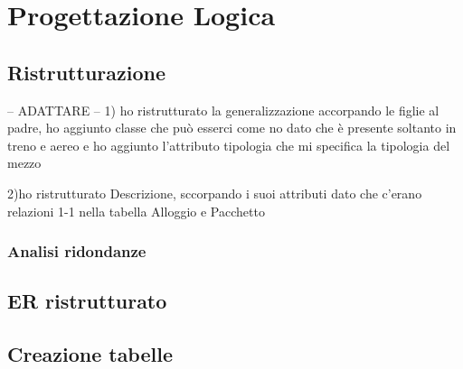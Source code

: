 \section{Progettazione Logica}
\subsection{Ristrutturazione}
-- ADATTARE --
1) ho ristrutturato la generalizzazione accorpando le figlie al padre, ho aggiunto classe che può esserci come no
dato che è presente soltanto in treno e aereo e ho aggiunto l'attributo tipologia che mi specifica la tipologia del mezzo

2)ho ristrutturato Descrizione, sccorpando i suoi attributi dato che c'erano relazioni 1-1 nella tabella Alloggio e Pacchetto
\subsubsection{Analisi ridondanze}
\subsection{ER ristrutturato}
\subsection{Creazione tabelle}